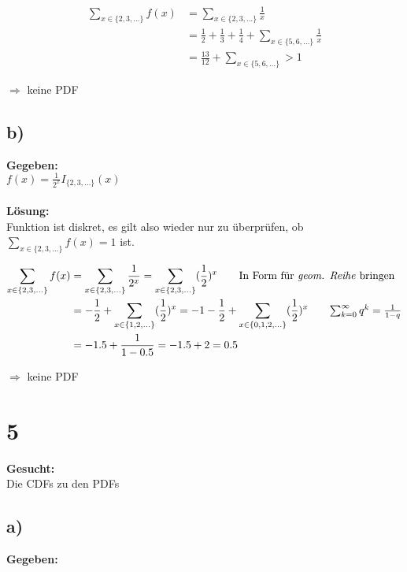 \documentclass{article}
\begin{document}
\begin{align*}
    \sum_{x \in \{2,3, \ldots \}}f(x) &= \sum_{x \in \{2,3, \ldots \}} \frac{1}{x} \\
    &=\frac{1}{2} + \frac{1}{3} + \frac{1}{4} + \sum_{x \in \{5,6, \ldots\}}\frac{1}{x} \\
    &= \frac{13}{12} + \sum_{x \in \{5,6, \ldots\}} > 1
\end{align*} 

    $\Longrightarrow$ keine PDF

\subsection*{b)}
\textbf{Gegeben:} \\

    $f(x) = \frac{1}{2^{x}}I_{\{2,3, \ldots\}}(x)$ \\ \\ 
\textbf{Lösung:}\\


Funktion ist diskret, es gilt also wieder nur zu überprüfen, ob $\sum_{x \in \{2,3, \ldots \}}f(x) = 1$ ist.
    
\begin{align*}
    \sum_{x \in \{2,3, \ldots \}}f(x) &= \sum_{x \in \{2,3, \ldots \}} \frac{1}{2^{x}} = \sum_{x \in \{2,3, \ldots \}} (\frac{1}{2})^x  \tag*{In Form für \textit{geom. Reihe} bringen} \\
    &=-\frac{1}{2} + \sum_{x \in \{1,2, \ldots \}}  (\frac{1}{2})^x = -1 - \frac{1}{2} + \sum_{x \in \{0,1,2, \ldots \}} (\frac{1}{2})^x \tag*{$\sum_{k=0}^{\infty}q^{k} = \frac{1}{1-q}$} \\
    &= -1.5 + \frac{1}{1-0.5} = -1.5 + 2 = 0.5 
\end{align*}

    $\Longrightarrow$ keine PDF

\section*{5}
\textbf{Gesucht:} \\

Die CDFs zu den PDFs 
\subsection*{a)}
\textbf{Gegeben:} \\
\end{document}

